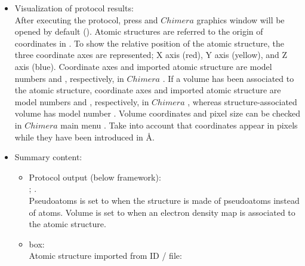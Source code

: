 \begin{itemize}
  \item Visualization of protocol results:\\
  
  After executing the protocol, press  and $Chimera$ graphics window will be opened by default (). 
  Atomic structures are referred to the origin of coordinates in \chimera. To show the relative position of the atomic structure, the three coordinate axes are represented; X axis (red), Y axis (yellow), and Z axis (blue). Coordinate axes and imported atomic structure are model numbers  and , respectively, in $Chimera$ . If a volume has been associated to the atomic structure, coordinate axes and imported atomic structure are model numbers  and , respectively, in $Chimera$ , whereas structure-associated volume has model number . Volume coordinates and pixel size can be checked in $Chimera$ main menu . Take into account that coordinates appear in pixels while they have been introduced in \AA.\\
   
   \item Summary content:\\
    \begin{itemize}
     \item Protocol output (below \scipion framework):\\ ; .\\Pseudoatoms is set to  when the structure is made of pseudoatoms instead of atoms. Volume is set to  when an electron density map is associated to the atomic structure.\\
     \item {} box:\\Atomic structure imported from ID / file: \\
    \end{itemize}

  \end{itemize}
